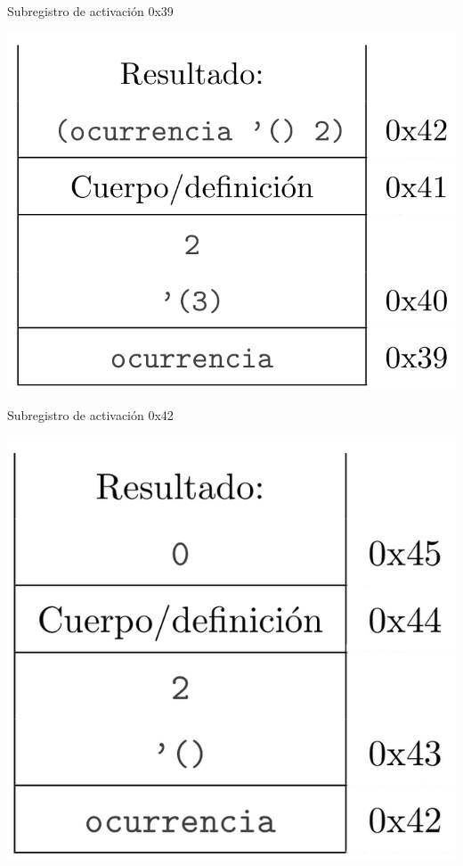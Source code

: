 \begin{multicols}{2}
Subregistro de activación 0x39
\begin{center}
        \includegraphics[scale=0.25]{./R9}
\end{center}

Subregistro de activación 0x42
\begin{center}
        \includegraphics[scale=0.25]{./R10}
\end{center}
\end{multicols}

